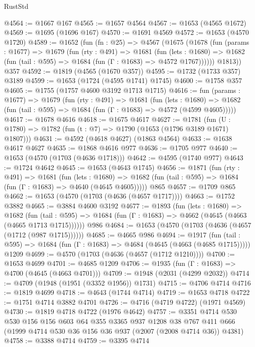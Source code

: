 \begin{lexlean}{RustStd}
\begin{coremodule}
@4564 := @1667 @167
@4565 := @1657 @4564
@4567 := @1653 (@4565 @1672)
@4569 := @1695 (@1696 @167)
@4570 := @1691 @4569
@4572 := @1653 (@4570 @1720)
@4589 := @1652
    (fun (fn : @25) =>
    @4567
      (@1675
        (@1678
          (fun (params : @1677) =>
          @1679
            (fun (rty : @491) =>
            @1681
              (fun (lets : @1680) =>
              @1682 (fun (tail : @595) => @1684 (fun (Γ : @1683) => @4572 @1767))))))
        @1813))
    @357
@4592 := @1819 (@4565 (@1670 @357))
@4595 := @1732 (@1733 @357) @3189
@4599 := @1653 (@1724 (@4595 @1741) @1745)
@4600 := @1758 @357
@4605 := @1755 (@1757 @4600 @3192 @1713 @1715)
@4616 := fun (params : @1677) =>
  @1679
    (fun (rty : @491) =>
    @1681
      (fun (lets : @1680) =>
      @1682 (fun (tail : @595) => @1684 (fun (Γ : @1683) => @4572 (@4599 @4605)))))
@4617 := @1678 @4616
@4618 := @1675 @4617
@4627 := @1781 (fun (U : @1780) => @1782 (fun (t : @7) => @1790 (@1653 (@1796 @3189 @1671) @1807)))
@4631 := @4592 (@4618 @4627) (@1863 @4564)
@4633 := @1638 @4617 @4627
@4635 := @1868 @4616 @977
@4636 := @1705 @977
@4640 := @1653 (@4570 (@1703 (@4636 @1718)))
@4642 := @4595 (@1740 @977)
@4643 := @1724 @4642
@4645 := @1653 (@4643 @1745)
@4656 := @1871
    (fun (rty : @491) =>
    @1681
      (fun (lets : @1680) =>
      @1682 (fun (tail : @595) => @1684 (fun (Γ : @1683) => @4640 (@4645 @4605)))))
    @865
@4657 := @1709 @865
@4662 := @1653 (@4570 (@1703 (@4636 (@4657 @1717))))
@4663 := @1752 @3882
@4665 := @3884 @4600 @3192
@4677 := @1893
    (fun (lets : @1680) =>
    @1682
      (fun (tail : @595) => @1684 (fun (Γ : @1683) => @4662 (@4645 (@4663 (@4665 @1713 @1715))))))
    @986
@4684 := @1653 (@4570 (@1703 (@4636 (@4657 (@1712 (@987 @1715))))))
@4685 := @4665 @986
@4694 := @1917
    (fun (tail : @595) => @1684 (fun (Γ : @1683) => @4684 (@4645 (@4663 (@4685 @1715)))))
    @1209
@4699 := @4570 (@1703 (@4636 (@4657 (@1712 @1210))))
@4700 := @1653 @4699
@4701 := @4685 @1209
@4706 := @1935 (fun (Γ : @1683) => @4700 (@4645 (@4663 @4701)))
@4709 := @1948 (@2031 (@4299 @2032))
@4714 := @4709 (@1948 (@1951 (@3352 @1956)) @1731)
@4715 := @4706 @4714
@4716 := @1819 @4699
@4718 := @4643 (@1744 @4714)
@4719 := @1653 @4718
@4722 := @1751 @4714 @3882 @4701
@4726 := @4716 (@4719 @4722) (@1971 @4569)
@4730 := @1819 @4718 @4722 (@1976 @4642)
@4757 := @3351
    @4714
    @530
    @530
    @156
    @156
    @603
    @64
    @355
    @3365
    @937
    @1208
    @38
    @767
    @411
    @666
    (@1999 @4714 @530 @36 @156 @36 @937 (@2007 (@2008 @4714 @36)) @4381)
@4758 := @3388 @4714
@4759 := @3395 @4714

\end{coremodule}
\end{lexlean}
